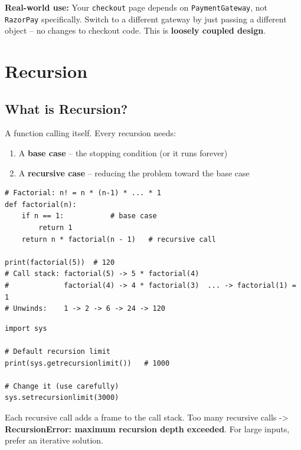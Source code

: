 \documentclass[12pt,a4paper]{article}
\newcommand{\code}[1]{\texttt{\small\color{pyblue}#1}}
\begin{document}
\begin{tipbox}
\textbf{Real-world use:} Your \code{checkout} page depends on \code{PaymentGateway}, not \code{RazorPay} specifically. Switch to a different gateway by just passing a different object -- no changes to checkout code. This is \textbf{loosely coupled design}.
\end{tipbox}

\section{Recursion}

\subsection{What is Recursion?}

A function calling itself. Every recursion needs:
\begin{enumerate}
  \item A \textbf{base case} -- the stopping condition (or it runs forever)
  \item A \textbf{recursive case} -- reducing the problem toward the base case
\end{enumerate}

\begin{lstlisting}
# Factorial: n! = n * (n-1) * ... * 1
def factorial(n):
    if n == 1:           # base case
        return 1
    return n * factorial(n - 1)   # recursive call

print(factorial(5))  # 120
# Call stack: factorial(5) -> 5 * factorial(4)
#             factorial(4) -> 4 * factorial(3)  ... -> factorial(1) = 1
# Unwinds:    1 -> 2 -> 6 -> 24 -> 120
\end{lstlisting}

\begin{lstlisting}
import sys

# Default recursion limit
print(sys.getrecursionlimit())   # 1000

# Change it (use carefully)
sys.setrecursionlimit(3000)
\end{lstlisting}

\begin{dangerbox}
Each recursive call adds a frame to the call stack. Too many recursive calls -> \textbf{RecursionError: maximum recursion depth exceeded}. For large inputs, prefer an iterative solution.
\end{dangerbox}
\end{document}

